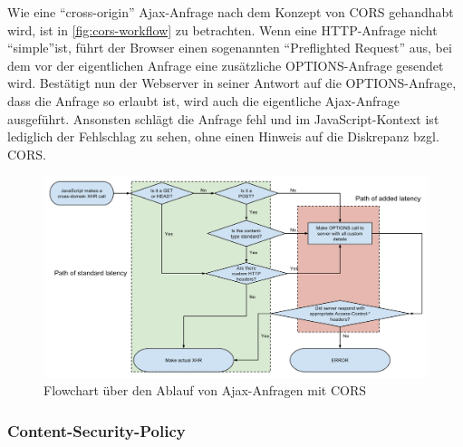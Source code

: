 Wie eine \enquote{cross-origin} Ajax-Anfrage nach dem Konzept von CORS gehandhabt wird, ist in \autoref{fig:cors-workflow} zu betrachten. Wenn eine HTTP-Anfrage nicht \enquote{simple}\footnotemark ist, führt der Browser einen sogenannten \enquote{Preflighted Request} aus, bei dem vor der eigentlichen Anfrage eine zusätzliche OPTIONS-Anfrage gesendet wird. Bestätigt nun der Webserver in seiner Antwort auf die OPTIONS-Anfrage, dass die Anfrage so erlaubt ist, wird auch die eigentliche Ajax-Anfrage ausgeführt. Ansonsten schlägt die Anfrage fehl und im JavaScript-Kontext ist lediglich der Fehlschlag zu sehen, ohne einen Hinweis auf die Diskrepanz bzgl. CORS.


\begin{figure}[H]
	\centering
	\includegraphics[width=\linewidth]{img/02_theorie/1280px-Flowchart_showing_Simple_and_Preflight_XHR.svg.png}
	\caption{Flowchart über den Ablauf von Ajax-Anfragen mit CORS \cite{FlowchartCORS}}
	\label{fig:cors-workflow}
\end{figure}

\subsubsection{Content-Security-Policy}



